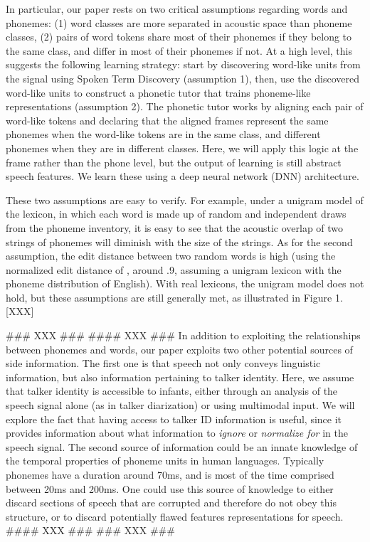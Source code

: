 \documentclass[a4paper]{article}
\begin{document}
In particular, our paper rests on two critical assumptions regarding words and phonemes: (1) word classes are more separated in acoustic space than phoneme classes, (2) pairs of word tokens share most of their phonemes if they belong to the same class, and differ in most of their phonemes if not. At a high level, this suggests the following learning strategy: start by discovering word-like units from the signal using Spoken Term Discovery  (assumption 1), then, use the discovered word-like units to construct a phonetic tutor that trains phoneme-like representations (assumption 2). The phonetic tutor works by aligning each pair of word-like tokens and declaring that the aligned frames represent the same phonemes when the word-like tokens are in the same class, and different phonemes when they are in different classes. Here, we will apply this logic at the frame rather than the phone level, but the output of learning is still abstract speech features. We learn these using a deep neural network (DNN) architecture.

These two assumptions are easy to verify. For example, under a unigram model of the lexicon, in which each word is made up of random and independent draws from the phoneme inventory, it is easy to see that the acoustic overlap of two strings of phonemes will diminish with the size of the strings. As for the second assumption, the edit distance between two random words is high (using the normalized edit distance of \cite{XXX}, around .9, assuming a unigram lexicon with the phoneme distribution of English). With real lexicons, the unigram model does not hold, but these assumptions are still generally met, as illustrated in Figure 1. [XXX]

### XXX ###
#### XXX ###
In addition to exploiting the relationships between phonemes and words, our paper exploits two other potential sources of side information. The first one is that speech not only conveys linguistic information, but also information pertaining to talker identity. Here, we assume that talker identity is accessible to infants, either through an analysis of the speech signal alone (as in talker diarization) or using multimodal input. We will explore the fact that having access to talker ID information is useful, since it provides information about what information to \emph{ignore} or \emph{normalize for} in the speech signal. The second source of information could be an innate knowledge of the temporal properties of phoneme units in human languages. Typically phonemes have a duration around 70ms, and is most of the time comprised between 20ms and 200ms. One could use this source of knowledge to either discard sections of speech that are corrupted and therefore do not obey this structure, or to discard potentially flawed features representations for speech.
#### XXX ###
### XXX ###
\end{document}
